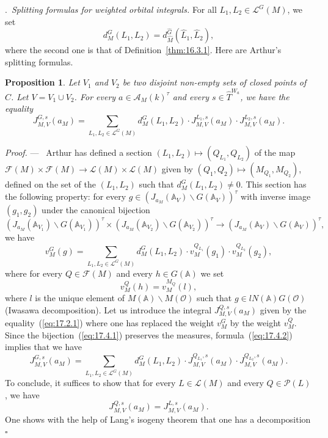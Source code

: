 \documentclass[12pt,a4paper,oneside,english,leqno]{smfart}
\makeatletter
\numberwithin{equation}{subsection}
\newcounter{theo}
\numberwithin{theo}{subsection}
\newenvironment{paragr}[1][]{\medskip\refstepcounter{subsection}%
  \par\noindent\hspace*{\parindent}\thesubsection.\ \emph{#1}%
  \@ifundefined{@empty}{}{}\ignorespaces}{\medskip}
\theoremstyle{plain}
\newtheorem{proposition}[theo]{Proposition}
\theoremstyle{definition}
\theoremstyle{remark}
\newenvironment{preuve}[1][]{\medskip\noindent\textit{Proof.} #1 ---\ }%
  {\hfill\ensuremath{\square}\medskip}
\newcommand{\AAA}{\mathbb{A}}
\newcommand{\oc}{\mathcal{O}}
\newcommand{\lc}{\mathcal{L}}
\newcommand{\fc}{\mathcal{F}}
\newcommand{\pc}{\mathcal{P}}
\newcommand{\Ac}{\mathcal{A}}
\newcommand{\Gc}{\widehat{G}}
\newcommand{\Tc}{\widehat{T}}
\newcommand{\Mc}{\widehat{M}}
\newcommand{\Lc}{\widehat{L}}
\newcommand{\back}{\backslash}
\makeatother
\begin{document}
\begin{paragr}[Splitting formulas for weighted orbital integrals.]\label{S:17.4}
For all $L_1,L_2\in\lc^G(M)$, we set
$$
d^G_M(L_1,L_2)=d^{\Gc}_{\Mc}(\Lc_1,\Lc_2),
$$
where the second one is that of Definition~\ref{thm:16.3.1}. Here are Arthur's splitting formulas.

\begin{proposition}\label{thm:17.4.1}
Let $V_1$ and $V_2$ be two disjoint non-empty sets of closed points of $C$. Let $V=V_1\cup V_2$. For every $a\in\Ac_M(k)^\tau$ and every $s\in\Tc^{W_a}$, we have the equality
$$
J^{G,s}_{M,V}(a_M)=\sum_{L_1,L_2\in\lc^G(M)}d^G_M(L_1,L_2)\cdot J^{L_1,s}_{M,V}(a_M)\cdot J^{L_2,s}_{M,V}(a_M).
$$
\end{proposition}

\begin{preuve}
Arthur has defined a section $(L_1,L_2)\mapsto(Q_{L_1},Q_{L_2})$ of the map $\fc(M)\times\fc(M)\to\lc(M)\times\lc(M)$ given by $(Q_1,Q_2)\mapsto(M_{Q_1},M_{Q_2})$, defined on the set of the $(L_1,L_2)$ such that $d^G_M(L_1,L_2)\neq 0$. This section has the following property: for every $g\in(J_{a_M}(\AAA_V)\back G(\AAA_V))^\tau$ with inverse image $(g_1,g_2)$ under the canonical bijection
\begin{equation}\label{eq:17.4.1}
(J_{a_M}(\AAA_{V_1})\back G(\AAA_{V_1}))^\tau\times
(J_{a_M}(\AAA_{V_2})\back G(\AAA_{V_2}))^\tau\to
(J_{a_M}(\AAA_V)\back G(\AAA_V))^\tau,
\end{equation}
we have
\begin{equation}\label{eq:17.4.2}
v^G_M(g)=\sum_{L_1,L_2\in\lc^G(M)}d^G_M(L_1,L_2)\cdot v^{Q_{L_1}}_M(g_1)\cdot
v^{Q_{L_2}}_M(g_2),
\end{equation}
where for every $Q\in\fc(M)$ and every $h\in G(\AAA)$ we set
$$
v^Q_M(h)=v^{M_Q}_M(l),
$$
where $l$ is the unique element of $M(\AAA)\back M(\oc)$ such that $g\in lN(\AAA)G(\oc)$ (Iwasawa decomposition). Let us introduce the integral $J^{Q,s}_{M,V}(a_M)$ given by the equality~(\ref{eq:17.2.1}) where one has replaced the weight $v^G_M$ by the weight $v^Q_M$. Since the bijection~(\ref{eq:17.4.1}) preserves the measures, formula~(\ref{eq:17.4.2}) implies that we have
$$
J^{G,s}_{M,V}(a_M)=\sum_{L_1,L_2\in\lc^G(M)}d^G_M(L_1,L_2)\cdot J^{Q_{L_1},s}_{M,V}(a_M)\cdot J^{Q_{L_2},s}_{M,V}(a_M).
$$
To conclude, it suffices to show that for every $L\in\lc(M)$ and every $Q\in\pc(L)$, we have
$$
J^{Q,s}_{M,V}(a_M)=J^{L,s}_{M,V}(a_M).
$$
One shows with the help of Lang's isogeny theorem that one has a decomposition
\begin{equation}\label{eq:17.4.3}

\end{equation}
\end{preuve}
\end{paragr}
\end{document}
